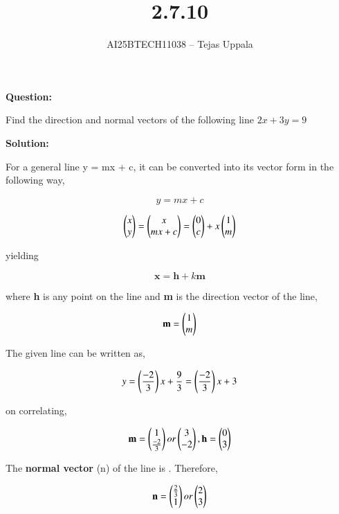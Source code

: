 \documentclass[journal,12pt,onecolumn]{IEEEtran}
\begin{document}
\title{2.7.10}
\author{AI25BTECH11038 -- Tejas Uppala}
{\let\newpage\relax\maketitle}

\textbf{Question:}

\noindent Find the direction and normal vectors of the following line $2x + 3y = 9$

\textbf{Solution:}

\noindent For a general line y = mx + c, it can be converted into its vector form in the following way,

\begin{equation}
    y = mx + c
\end{equation}

\begin{equation}
    \begin{pmatrix}x\\y\end{pmatrix} = \begin{pmatrix}x\\mx+c\end{pmatrix} = \begin{pmatrix}0\\c\end{pmatrix} + x\begin{pmatrix}1\\m\end{pmatrix}    
\end{equation}

\noindent yielding

\begin{equation}
    \textbf{x} = \textbf{h} + k\textbf{m}
\end{equation}

\noindent where \textbf{h} is any point on the line and \textbf{m} is the direction vector of the line,

\begin{equation}
    \textbf{m} = \begin{pmatrix}1\\m\end{pmatrix}
\end{equation}

\noindent The given line can be written as, 

\begin{equation}
    y = \left(\frac{-2}{3}\right)x + \frac{9}{3} = \left(\frac{-2}{3}\right)x + 3
\end{equation}

\noindent on correlating,

\begin{equation}
    \textbf{m} = \begin{pmatrix}1 \\ \frac{-2}{3}\end{pmatrix} or \begin{pmatrix}3\\-2\end{pmatrix}, \textbf{h} = \begin{pmatrix}0\\3\end{pmatrix}
\end{equation}

\noindent The \textbf{normal vector} (n) of the line is . Therefore, 

\begin{equation}
    \textbf{n} = \begin{pmatrix}\frac{2}{3}\\1\end{pmatrix} or \begin{pmatrix}2\\3\end{pmatrix}
\end{equation}
\end{document}
